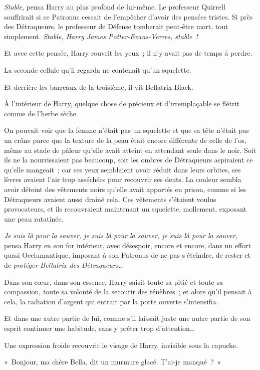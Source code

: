 \emph{Stable}, pensa Harry au plus profond de lui-même. Le professeur Quirrell souffrirait si ce Patronus cessait de l'empêcher d'avoir des pensées tristes. Si près des Détraqueurs, le professeur de Défense tomberait peut-être mort, tout simplement. \emph{Stable, Harry James Potter-Evans-Verres, stable~!}

Et avec cette pensée, Harry rouvrit les yeux~; il n'y avait pas de temps à perdre.

La seconde cellule qu'il regarda ne contenait qu'un squelette.

Et derrière les barreaux de la troisième, il vit Bellatrix Black.

À l'intérieur de Harry, quelque chose de précieux et d'irremplaçable se flétrit comme de l'herbe sèche.

On pouvait voir que la femme n'était pas un squelette et que sa tête n'était pas un crâne parce que la texture de la peau était encore différente de celle de l'os, même au stade de pâleur qu'elle avait atteint en attendant seule dans le noir. Soit ils ne la nourrissaient pas beaucoup, soit les ombres de Détraqueurs aspiraient ce qu'elle mangeait~; car ses yeux semblaient avoir réduit dans leurs orbites, ses lèvres avaient l'air trop asséchées pour recouvrir ses dents. La couleur sembla avoir déteint des vêtements noirs qu'elle avait apportés en prison, comme si les Détraqueurs avaient aussi drainé cela. Ces vêtements s'étaient voulus provocateurs, et ils recouvraient maintenant un squelette, mollement, exposant une peau ratatinée.

\emph{Je suis là pour la sauver, je suis là pour la sauver, je suis là pour la sauver}, pensa Harry en son for intérieur, avec désespoir, encore et encore, dans un effort quasi Occlumantique, imposant à son Patronus de ne pas s'éteindre, de rester et de \emph{protéger Bellatrix des Détraqueurs…}

Dans son cœur, dans son essence, Harry saisit toute sa pitié et toute sa compassion, toute sa volonté de la secourir des ténèbres~; et alors qu'il pensait à cela, la radiation d'argent qui entrait par la porte ouverte s'intensifia.

Et dans une autre partie de lui, comme s'il laissait juste une autre partie de son esprit continuer une habitude, sans y prêter trop d'attention…

Une expression froide recouvrit le visage de Harry, invisible sous la capuche.

«~Bonjour, ma chère Bella, dit un murmure glacé. T'ai-je manqué~?~»
